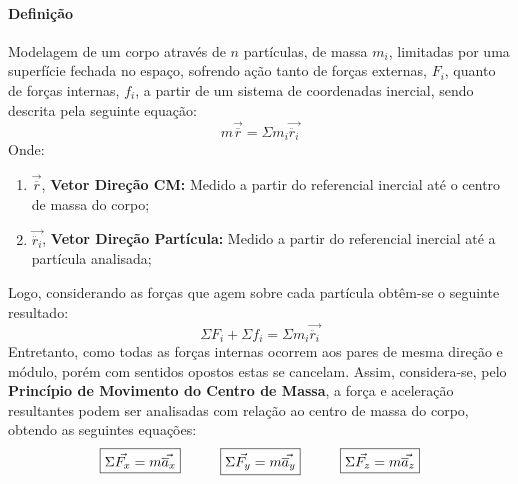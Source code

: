 \documentclass{article}
\begin{document}
            \paragraph{Definição}Modelagem de um corpo através de $n$ partículas, de massa $m_{i}$, limitadas por uma superfície fechada no espaço, sofrendo ação tanto de forças externas, $F_{i}$, quanto de forças internas, $f_{i}$, a partir de um sistema de coordenadas inercial, sendo descrita pela seguinte equação:
                \begin{equation}
                    m\vec{\overline{r}} = \Sigma m_{i}\vec{\ddot{r_{i}}}
                \end{equation}
            Onde:
                \begin{enumerate}[rightmargin = \leftmargin, noitemsep]
                    \item $\vec{\overline{r}}$, \textbf{Vetor Direção CM:} Medido a partir do referencial inercial até o centro de massa do corpo;
                    \item $\vec{\ddot{r_{i}}}$, \textbf{Vetor Direção Partícula:} Medido a partir do referencial inercial até a partícula analisada;
                \end{enumerate}
            Logo, considerando as forças que agem sobre cada partícula obtêm-se o seguinte resultado:
                \begin{equation}
                    \Sigma F_{i} + \Sigma f_{i} = \Sigma m_{i}\vec{\ddot{r_{i}}}
                \end{equation}
            Entretanto, como todas as forças internas ocorrem aos pares de mesma direção e módulo, porém com sentidos opostos estas se cancelam. Assim, considera-se, pelo \textbf{Princípio de Movimento do Centro de Massa}, a força e aceleração resultantes podem ser analisadas com relação ao centro de massa do corpo, obtendo as seguintes equações:
                \begin{equation}
                    \boxed{
                        \Sigma\vec{F_{x}} = m \vec{\overline{a}_{x}}
                    }
                    \hspace{10mm}
                    \boxed{
                        \Sigma\vec{F_{y}} = m \vec{\overline{a}_{y}}
                    }
                    \hspace{10mm}
                    \boxed{
                        \Sigma\vec{F_{z}} = m \vec{\overline{a}_{z}}
                    }
                \end{equation}
\end{document}

